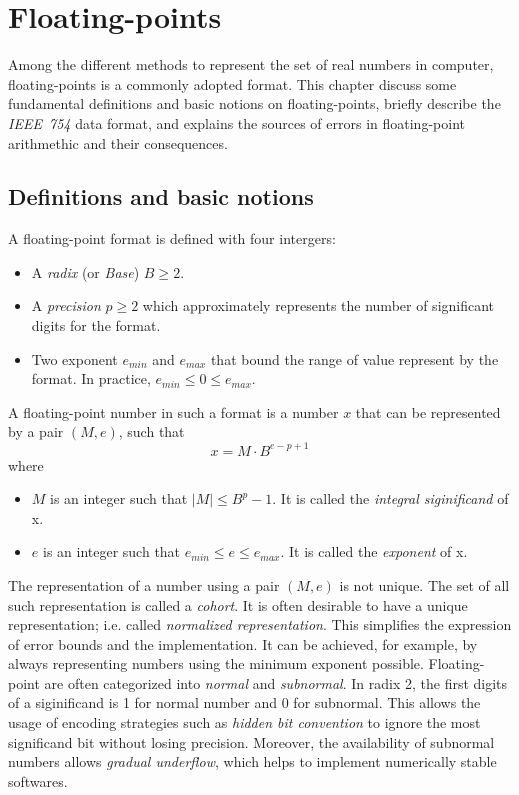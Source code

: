 \chapter{Floating-points}
Among the different methods to represent the set of real numbers in computer,
floating-points is a commonly adopted format.
This chapter discuss some fundamental definitions and basic notions on
floating-points, briefly describe the \textit{IEEE~754} data format, and 
explains the sources of errors in floating-point arithmethic and their consequences.

\section{Definitions and basic notions}
A floating-point format is defined with four intergers:
\begin{itemize}
	\item A \textit{radix} (or \textit{Base}) $B \ge 2$.
	\item A \textit{precision} $p \ge 2$ which approximately represents the number of significant digits for the format.
	\item Two exponent $e_{min}$ and $e_{max}$ that bound the range of value represent by the format. In practice, $e_{min} \le 0 \le e_{max}$.
\end{itemize}

A floating-point number in such a format is a number $x$ that can be represented by a pair $(M,e)$, such that
\begin{equation}
	x = M \cdot B^{e-p+1}
\end{equation}
where
\begin{itemize}
	\item $M$ is an integer such that $|M| \le B^{p}-1$. It is called the \textit{integral siginificand} of x.
	\item $e$ is an integer such that $e_{min} \le e \le e_{max}$. It is called the \textit{exponent} of x.
\end{itemize}
The representation of a number using a pair $(M, e)$ is not unique.
The set of all such representation is called a \textit{cohort}.
It is often desirable to have a unique representation; i.e. called \textit{normalized representation}.
This simplifies the expression of error bounds and the implementation.
It can be achieved, for example, by always representing numbers using the minimum exponent possible.
Floating-point are often categorized into \textit{normal} and \textit{subnormal}.
In radix 2, the first digits of a siginificand is 1 for normal number and 0 for subnormal.
This allows the usage of encoding strategies such as \textit{hidden bit convention} to
ignore the most significand bit without losing precision.
Moreover, the availability of subnormal numbers allows \textit{gradual underflow},
which helps to implement numerically stable softwares.

